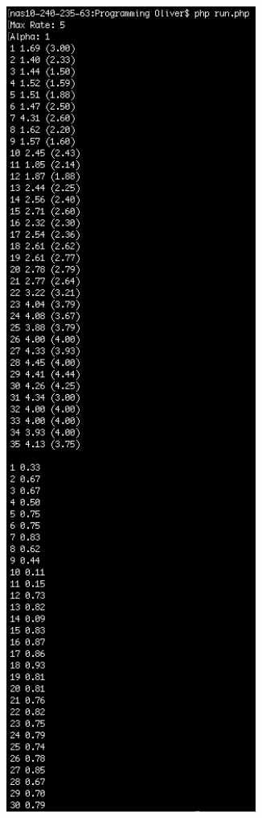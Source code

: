 \documentclass{article}
\begin{document}
\begin{figure}[htp]
\centering
\begin{subfigure}{0.45\textwidth}
\centering
\includegraphics[width=0.9\textwidth]{Screenshots/Alpha1}

\end{subfigure}
\end{figure}
\end{document}
